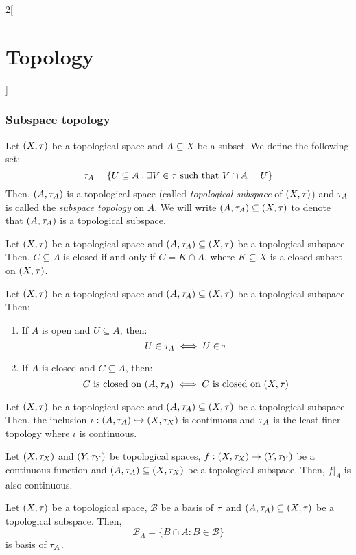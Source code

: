 \documentclass[../../../main.tex]{subfiles}
\begin{document}
\begin{multicols}{2}[\section{Topology}]
  \subsubsection{Subspace topology}
  \begin{definition}
    Let $(X,\tau)$ be a topological space and $A\subseteq X$ be a subset. We define the following set: $$\tau_A=\{U\subseteq A:\exists V\in\tau\text{ such that }V\cap A=U\}$$ Then, $(A,\tau_A)$ is a topological space (called \textit{topological subspace} of $(X,\tau)$) and $\tau_A$ is called the \textit{subspace topology} on $A$. We will write $(A,\tau_A)\subseteq (X,\tau)$ to denote that $(A,\tau_A)$ is a topological subspace.
  \end{definition}
  \begin{prop}
    Let $(X,\tau)$ be a topological space and $(A,\tau_A)\subseteq (X,\tau)$ be a topological subspace. Then, $C\subseteq A$ is closed if and only if $C=K\cap A$, where $K\subseteq X$ is a closed subset on $(X,\tau)$.
  \end{prop}
  \begin{prop}
    Let $(X,\tau)$ be a topological space and $(A,\tau_A)\subseteq (X,\tau)$ be a topological subspace. Then:
    \begin{enumerate}
      \item If $A$ is open and $U\subseteq A$, then: $$U\in\tau_A\iff U\in\tau$$
      \item If $A$ is closed and $C\subseteq A$, then: $$C\text{ is closed on }(A,\tau_A)\iff C\text{ is closed on }(X,\tau)$$
    \end{enumerate}
  \end{prop}
  \begin{prop}
    Let $(X,\tau)$ be a topological space and $(A,\tau_A)\subseteq (X,\tau)$ be a topological subspace. Then, the inclusion $\iota:(A,\tau_A)\hookrightarrow (X,\tau_X)$ is continuous and $\tau_A$ is the least finer topology where $\iota$ is continuous.
  \end{prop}
  \begin{corollary}
    Let $(X,\tau_X)$ and $(Y,\tau_Y)$ be topological spaces, $f:(X,\tau_X)\rightarrow (Y,\tau_Y)$ be a continuous function and $(A,\tau_A)\subseteq (X,\tau_X)$ be a topological subspace. Then, $f|_A$ is also continuous.
  \end{corollary}
  \begin{prop}
    Let $(X,\tau)$ be a topological space, $\mathcal{B}$ be a basis of $\tau$ and $(A,\tau_A)\subseteq (X,\tau)$ be a topological subspace. Then, $$\mathcal{B}_A=\{B\cap A:B\in\mathcal{B}\}$$ is basis of $\tau_A$.

\end{prop}
\end{multicols}
\end{document}
